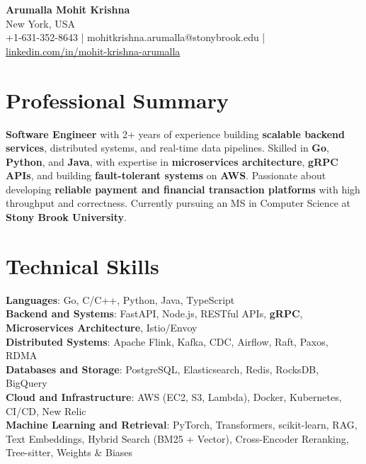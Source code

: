 \documentclass[letterpaper,11pt]{article}
\begin{document}
\begin{center}
  {\Large \textbf{Arumalla Mohit Krishna}} \\
  New York, USA \\
  +1-631-352-8643 \enspace | \enspace mohitkrishna.arumalla@stonybrook.edu \enspace | \enspace \href{https://www.linkedin.com/in/mohit-krishna-arumalla}{linkedin.com/in/mohit-krishna-arumalla}
\end{center}

\section{Professional Summary}
  \begin{itemize}[leftmargin=0.15in, label={}]
    \small{\item{
     \textbf{Software Engineer} with 2+ years of experience building \textbf{scalable backend services}, distributed systems, and real-time data pipelines. Skilled in \textbf{Go}, \textbf{Python}, and \textbf{Java}, with expertise in \textbf{microservices architecture}, \textbf{gRPC APIs}, and building \textbf{fault-tolerant systems} on \textbf{AWS}. Passionate about developing \textbf{reliable payment and financial transaction platforms} with high throughput and correctness. Currently pursuing an MS in Computer Science at \textbf{Stony Brook University}.
    }}
  \end{itemize}
\vspace{-16pt}

\section{Technical Skills}
 \begin{itemize}[leftmargin=0.15in, label={}]
    \small{\item{
     \textbf{Languages}: Go, C/C++, Python, Java, TypeScript \\
     \textbf{Backend and Systems}: FastAPI, Node.js, RESTful APIs, \textbf{gRPC}, \textbf{Microservices Architecture}, Istio/Envoy \\
     \textbf{Distributed Systems}: Apache Flink, Kafka, CDC, Airflow, Raft, Paxos, RDMA \\
     \textbf{Databases and Storage}: PostgreSQL, Elasticsearch, Redis, RocksDB, BigQuery \\
     \textbf{Cloud and Infrastructure}: AWS (EC2, S3, Lambda), Docker, Kubernetes, CI/CD, New Relic \\
     \textbf{Machine Learning and Retrieval}: PyTorch, Transformers, scikit-learn, RAG, Text Embeddings, Hybrid Search (BM25 + Vector), Cross-Encoder Reranking, Tree-sitter, Weights \& Biases
    }}
 \end{itemize}
\vspace{-16pt}
\end{document}
